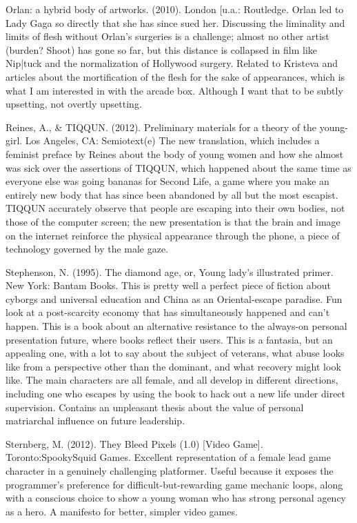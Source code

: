 Orlan: a hybrid body of artworks. (2010). London [u.a.: Routledge.
	Orlan led to Lady Gaga so directly that she has since sued her. Discussing the liminality and limits of flesh without Orlan’s surgeries is a challenge; almost no other artist (burden? Shoot) has gone so far, but this distance is collapsed in film like Nip|tuck and the normalization of Hollywood surgery. Related to Kristeva and articles about the mortification of the flesh for the sake of appearances, which is what I am interested in with the arcade box. Although I want that to be subtly upsetting, not overtly upsetting.

Reines, A., & TIQQUN. (2012). Preliminary materials for a theory of the young-girl. Los Angeles, CA: Semiotext(e)
	The new translation, which includes a feminist preface by Reines about the body of young women and how she almost was sick over the assertions of TIQQUN, which happened about the same time as everyone else was going bananas for Second Life, a game where you make an entirely new body that has since been abandoned by all but the most escapist. TIQQUN accurately observe that people are escaping into their own bodies, not those of the computer screen; the new presentation is that the brain and image on the internet reinforce the physical appearance through the phone, a piece of technology governed by the male gaze.


Stephenson, N. (1995). The diamond age, or, Young lady's illustrated primer. New York: Bantam Books.
	This is pretty well a perfect piece of fiction about cyborgs and universal education and China as an Oriental-escape paradise. Fun look at a post-scarcity economy that has simultaneously happened and can’t happen. This is a book about an alternative resistance to the always-on personal presentation future, where books reflect their users. This is a fantasia, but an appealing one, with a lot to say about the subject of veterans, what abuse looks like from a perspective other than the dominant, and what recovery might look like. The main characters are all female, and all develop in different directions, including one who escapes by using the book to hack out a new life under direct supervision. Contains an unpleasant thesis about the value of personal matriarchal influence on future leadership.

Sternberg, M. (2012). They Bleed Pixels (1.0) [Video Game]. Toronto:SpookySquid Games.
	Excellent representation of a female lead game character in a genuinely challenging platformer. Useful because it exposes the programmer’s preference for difficult-but-rewarding game mechanic loops, along with a conscious choice to show a young woman who has strong personal agency as a hero. A manifesto for better, simpler video games.
	
